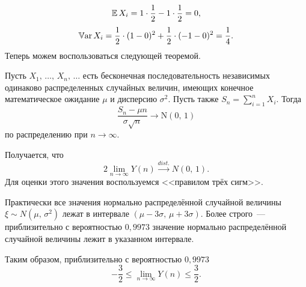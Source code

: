 $$
        \mathbb{E}\,X_i = 1 \cdot \frac12 - 1 \cdot \frac12 = 0,
$$
$$
        \mathbb{V}\mbox{ar}\,X_i = \frac12 \cdot (1 - 0)^2 + \frac12 \cdot (-1 - 0)^2 = \frac14.
$$
Теперь можем воспользоваться следующей теоремой.
\begin{theorem}
        Пусть $X_1,\,\ldots,\,X_n,\,\ldots$ есть бесконечная последовательность независимых одинаково распределенных случайных величин, имеющих конечное математическое ожидание $\mu$ и дисперсию $\sigma^2$. Пусть также $S_n = \sum_{i=1}^{n} X_i$. Тогда
        $$
                \frac{S_n - \mu n}{\sigma\sqrt{n}} \longrightarrow \mbox{N}(0,\, 1)
        $$
        по распределению при $n\to\infty$.
\end{theorem}
Получается, что
$$
        2\lim\limits_{n\to\infty}Y(n) \xrightarrow{dist.} N(0,\,1).
$$
Для оценки этого значения воспользуемся <<правилом трёх сигм>>.
\begin{theorem}
        Практически все значения нормально распределённой случайной величины $\xi \sim N(\mu,\,\sigma^2)$ лежат в интервале $(\mu - 3\sigma,\,\mu + 3\sigma)$. Более строго~--- приблизительно с вероятностью $0,9973$ значение нормально распределённой случайной величины лежит в указанном интервале.
\end{theorem}
Таким образом, приблизительно с вероятностью $0,9973$
$$
        -\frac32\leqslant\lim\limits_{n\to\infty}Y(n)\leqslant\frac32.
$$

